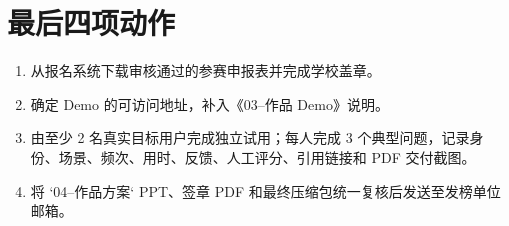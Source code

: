 \documentclass[11pt,a4paper]{article}
\begin{document}
\section*{最后四项动作}
\begin{enumerate}[leftmargin=2.2em,itemsep=0.3em]
\item 从报名系统下载审核通过的参赛申报表并完成学校盖章。
\item 确定 Demo 的可访问地址，补入《03--作品 Demo》说明。
\item 由至少 2 名真实目标用户完成独立试用；每人完成 3 个典型问题，记录身份、场景、频次、用时、反馈、人工评分、引用链接和 PDF 交付截图。
\item 将 `04--作品方案` PPT、签章 PDF 和最终压缩包统一复核后发送至发榜单位邮箱。
\end{enumerate}
\end{document}
